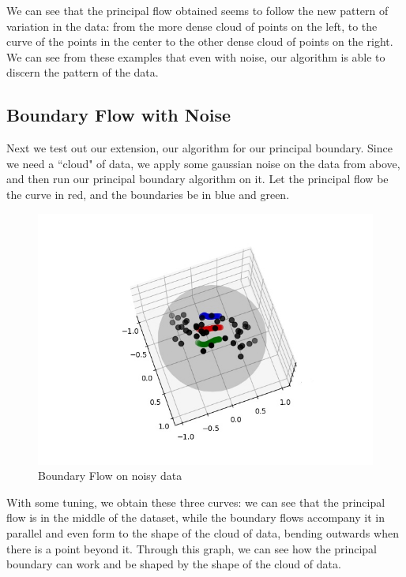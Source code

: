 \documentclass[12pt]{report}
\begin{document}
We can see that the principal flow obtained seems to follow the new pattern 
of variation in the data: from the more dense cloud of points on the left, to the curve of
the points in the center to the other dense cloud of points on the right.
We can see from these examples that even with noise, our algorithm is able to discern 
the pattern of the data.

\subsection{Boundary Flow with Noise}

Next we test out our extension, our algorithm for our principal boundary.
Since we need a ``cloud" of data, we apply some gaussian noise on the data from above,
and then run our principal boundary algorithm on it. Let the principal flow
be the curve in red, and the boundaries be in blue and green.

\begin{figure}[ht]
    \begin{center}
        \includegraphics[scale=0.5]{noisy_boundary_flow13.jpg}
        \caption{Boundary Flow on noisy data}
        \label{fig:boundaryflows}
    \end{center}
\end{figure}

With some tuning, we obtain these three curves: we can see that the principal flow
is in the middle of the dataset, while the boundary flows accompany it in parallel
and even form to the shape of the cloud of data, bending outwards
when there is a point beyond it. Through this graph, we can see how the principal
boundary can work and be shaped by the shape of the cloud of data.
\end{document}
